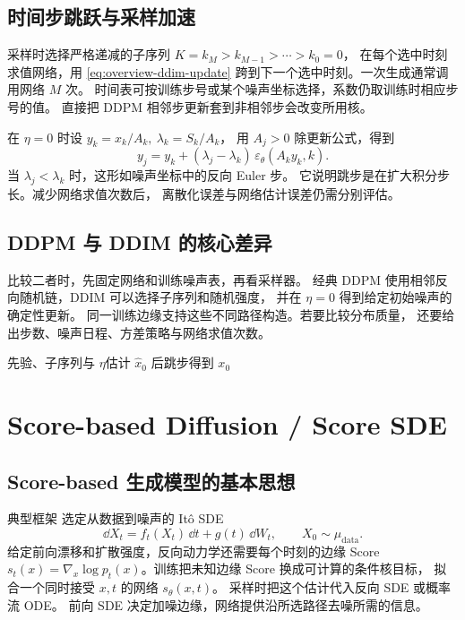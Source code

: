 \subsection{时间步跳跃与采样加速}

采样时选择严格递减的子序列 \(K=k_M>k_{M-1}>\cdots>k_0=0\)，
在每个选中时刻求值网络，用 \eqref{eq:overview-ddim-update}
跨到下一个选中时刻。一次生成通常调用网络 \(M\) 次。
时间表可按训练步号或某个噪声坐标选择，系数仍取训练时相应步号的值。
直接把 DDPM 相邻步更新套到非相邻步会改变所用核。

在 \(\eta=0\) 时设 \(y_k=x_k/A_k,\ \lambda_k=S_k/A_k\)，
用 \(A_j>0\) 除更新公式，得到
\begin{equation}
  y_j=y_k+(\lambda_j-\lambda_k)\,
                        \varepsilon_\theta(A_ky_k,k).
  \label{eq:overview-ddim-rescaled}
\end{equation}
当 \(\lambda_j<\lambda_k\) 时，这形如噪声坐标中的反向 Euler 步。
它说明跳步是在扩大积分步长。减少网络求值次数后，
离散化误差与网络估计误差仍需分别评估。

\subsection{DDPM 与 DDIM 的核心差异}

比较二者时，先固定网络和训练噪声表，再看采样器。
经典 DDPM 使用相邻反向随机链，DDIM 可以选择子序列和随机强度，
并在 \(\eta=0\) 得到给定初始噪声的确定性更新。
同一训练边缘支持这些不同路径构造。若要比较分布质量，
还要给出步数、噪声日程、方差策略与网络求值次数。

  {先验、子序列与 \(\eta\)}{估计 \(\widehat x_0\) 后跳步}{得到 \(x_0\)}
\section{Score-based Diffusion / Score SDE}
\label{sec:overview-score-sde}

\subsection{Score-based 生成模型的基本思想}

典型框架 \cite{song2021sde} 选定从数据到噪声的 Itô SDE
\[
  \dd X_t=f_t(X_t)\,\dd t+g(t)\,\dd W_t,\qquad X_0\sim\mu_{\mathrm{data}} .
\]
给定前向漂移和扩散强度，反向动力学还需要每个时刻的边缘 Score
\(s_t(x)=\nabla_x\log p_t(x)\)。训练把未知边缘 Score 换成可计算的条件核目标，
拟合一个同时接受 \(x,t\) 的网络 \(s_\theta(x,t)\)。
采样时把这个估计代入反向 SDE 或概率流 ODE。
前向 SDE 决定加噪边缘，网络提供沿所选路径去噪所需的信息。

